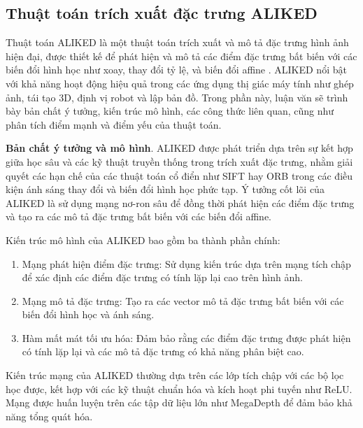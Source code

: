 \subsection{Thuật toán trích xuất đặc trưng ALIKED} \label{sec:aliked}

Thuật toán ALIKED là một thuật toán trích xuất và mô tả đặc trưng hình ảnh hiện đại, được thiết kế để phát hiện và mô tả các điểm đặc trưng bất biến với các biến đổi hình học như xoay, thay đổi tỷ lệ, và biến đổi affine \citep{zhao2023aliked}. ALIKED nổi bật với khả năng hoạt động hiệu quả trong các ứng dụng thị giác máy tính như ghép ảnh, tái tạo 3D, định vị robot và lập bản đồ. Trong phần này, luận văn sẽ trình bày bản chất ý tưởng, kiến trúc mô hình, các công thức liên quan, cũng như phân tích điểm mạnh và điểm yếu của thuật toán.

\textbf{Bản chất ý tưởng và mô hình}. ALIKED được phát triển dựa trên sự kết hợp giữa học sâu và các kỹ thuật truyền thống trong trích xuất đặc trưng, nhằm giải quyết các hạn chế của các thuật toán cổ điển như SIFT \citep{Lowe04Distinctive} hay ORB \citep{rublee2011orb} trong các điều kiện ánh sáng thay đổi và biến đổi hình học phức tạp. Ý tưởng cốt lõi của ALIKED là sử dụng mạng nơ-ron sâu để đồng thời phát hiện các điểm đặc trưng và tạo ra các mô tả đặc trưng bất biến với các biến đổi affine. 

Kiến trúc mô hình của ALIKED bao gồm ba thành phần chính:
\begin{enumerate}
    \item Mạng phát hiện điểm đặc trưng: Sử dụng kiến trúc dựa trên mạng tích chập để xác định các điểm đặc trưng có tính lặp lại cao trên hình ảnh.
    \item Mạng mô tả đặc trưng: Tạo ra các vector mô tả đặc trưng bất biến với các biến đổi hình học và ánh sáng.
    \item Hàm mất mát tối ưu hóa: Đảm bảo rằng các điểm đặc trưng được phát hiện có tính lặp lại và các mô tả đặc trưng có khả năng phân biệt cao.
\end{enumerate}

Kiến trúc mạng của ALIKED thường dựa trên các lớp tích chập với các bộ lọc học được, kết hợp với các kỹ thuật chuẩn hóa và kích hoạt phi tuyến như ReLU. Mạng được huấn luyện trên các tập dữ liệu lớn như MegaDepth \citep{li2018megadepth} để đảm bảo khả năng tổng quát hóa.

